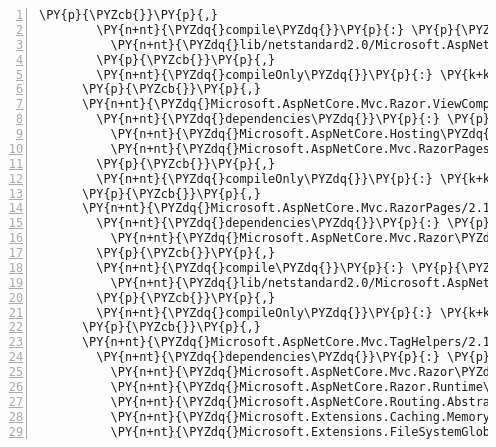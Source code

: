 \begin{Verbatim}[commandchars=\\\{\},numbers=left,firstnumber=1,stepnumber=1,numberblanklines=0]
        \PY{p}{\PYZcb{}}\PY{p}{,}
        \PY{n+nt}{\PYZdq{}compile\PYZdq{}}\PY{p}{:} \PY{p}{\PYZob{}}
          \PY{n+nt}{\PYZdq{}lib/netstandard2.0/Microsoft.AspNetCore.Mvc.Razor.Extensions.dll\PYZdq{}}\PY{p}{:} \PY{p}{\PYZob{}}\PY{p}{\PYZcb{}}
        \PY{p}{\PYZcb{}}\PY{p}{,}
        \PY{n+nt}{\PYZdq{}compileOnly\PYZdq{}}\PY{p}{:} \PY{k+kc}{true}
      \PY{p}{\PYZcb{}}\PY{p}{,}
      \PY{n+nt}{\PYZdq{}Microsoft.AspNetCore.Mvc.Razor.ViewCompilation/2.1.0\PYZhy{}rc1\PYZhy{}final\PYZdq{}}\PY{p}{:} \PY{p}{\PYZob{}}
        \PY{n+nt}{\PYZdq{}dependencies\PYZdq{}}\PY{p}{:} \PY{p}{\PYZob{}}
          \PY{n+nt}{\PYZdq{}Microsoft.AspNetCore.Hosting\PYZdq{}}\PY{p}{:} \PY{l+s+s2}{\PYZdq{}2.1.0\PYZhy{}rc1\PYZhy{}final\PYZdq{}}\PY{p}{,}
          \PY{n+nt}{\PYZdq{}Microsoft.AspNetCore.Mvc.RazorPages\PYZdq{}}\PY{p}{:} \PY{l+s+s2}{\PYZdq{}2.1.0\PYZhy{}rc1\PYZhy{}final\PYZdq{}}
        \PY{p}{\PYZcb{}}\PY{p}{,}
        \PY{n+nt}{\PYZdq{}compileOnly\PYZdq{}}\PY{p}{:} \PY{k+kc}{true}
      \PY{p}{\PYZcb{}}\PY{p}{,}
      \PY{n+nt}{\PYZdq{}Microsoft.AspNetCore.Mvc.RazorPages/2.1.0\PYZhy{}rc1\PYZhy{}final\PYZdq{}}\PY{p}{:} \PY{p}{\PYZob{}}
        \PY{n+nt}{\PYZdq{}dependencies\PYZdq{}}\PY{p}{:} \PY{p}{\PYZob{}}
          \PY{n+nt}{\PYZdq{}Microsoft.AspNetCore.Mvc.Razor\PYZdq{}}\PY{p}{:} \PY{l+s+s2}{\PYZdq{}2.1.0\PYZhy{}rc1\PYZhy{}final\PYZdq{}}
        \PY{p}{\PYZcb{}}\PY{p}{,}
        \PY{n+nt}{\PYZdq{}compile\PYZdq{}}\PY{p}{:} \PY{p}{\PYZob{}}
          \PY{n+nt}{\PYZdq{}lib/netstandard2.0/Microsoft.AspNetCore.Mvc.RazorPages.dll\PYZdq{}}\PY{p}{:} \PY{p}{\PYZob{}}\PY{p}{\PYZcb{}}
        \PY{p}{\PYZcb{}}\PY{p}{,}
        \PY{n+nt}{\PYZdq{}compileOnly\PYZdq{}}\PY{p}{:} \PY{k+kc}{true}
      \PY{p}{\PYZcb{}}\PY{p}{,}
      \PY{n+nt}{\PYZdq{}Microsoft.AspNetCore.Mvc.TagHelpers/2.1.0\PYZhy{}rc1\PYZhy{}final\PYZdq{}}\PY{p}{:} \PY{p}{\PYZob{}}
        \PY{n+nt}{\PYZdq{}dependencies\PYZdq{}}\PY{p}{:} \PY{p}{\PYZob{}}
          \PY{n+nt}{\PYZdq{}Microsoft.AspNetCore.Mvc.Razor\PYZdq{}}\PY{p}{:} \PY{l+s+s2}{\PYZdq{}2.1.0\PYZhy{}rc1\PYZhy{}final\PYZdq{}}\PY{p}{,}
          \PY{n+nt}{\PYZdq{}Microsoft.AspNetCore.Razor.Runtime\PYZdq{}}\PY{p}{:} \PY{l+s+s2}{\PYZdq{}2.1.0\PYZhy{}rc1\PYZhy{}final\PYZdq{}}\PY{p}{,}
          \PY{n+nt}{\PYZdq{}Microsoft.AspNetCore.Routing.Abstractions\PYZdq{}}\PY{p}{:} \PY{l+s+s2}{\PYZdq{}2.1.0\PYZhy{}rc1\PYZhy{}final\PYZdq{}}\PY{p}{,}
          \PY{n+nt}{\PYZdq{}Microsoft.Extensions.Caching.Memory\PYZdq{}}\PY{p}{:} \PY{l+s+s2}{\PYZdq{}2.1.0\PYZhy{}rc1\PYZhy{}final\PYZdq{}}\PY{p}{,}
          \PY{n+nt}{\PYZdq{}Microsoft.Extensions.FileSystemGlobbing\PYZdq{}}\PY{p}{:} \PY{l+s+s2}{\PYZdq{}2.1.0\PYZhy{}rc1\PYZhy{}final\PYZdq{}}\PY{p}{,}

\end{Verbatim}
